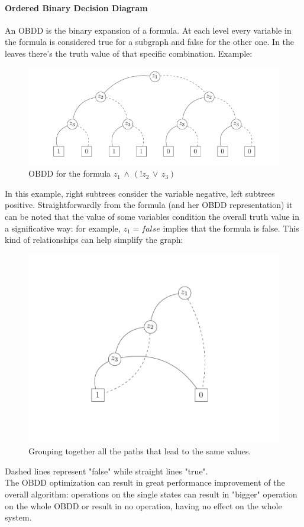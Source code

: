 \documentclass{article}
\begin{document}
				\paragraph{Ordered Binary Decision Diagram}
					An OBDD is the binary expansion of a formula. At each level every variable in the formula is considered true for a subgraph and false for the other one. In the leaves there's the truth value of that specific combination. Example:
					\begin{figure}[H]
						\centering
						\includegraphics[width = \textwidth]{./images/OBDD.png}
						\caption{OBDD for the formula $z_1 \,\wedge\, (!z_2 \,\vee\, z_3)$}
					\end{figure}
					In this example, right subtrees consider the variable negative, left subtrees positive. Straightforwardly from the formula (and her OBDD representation) it can be noted that the value of some variables condition the overall truth value in a significative way: for example, $z_1 = false$ implies that the formula is false. This kind of relationships can help simplify the graph:
					\begin{figure}[H]
						\centering
						\includegraphics[width = \textwidth]{./images/OBDD2.png}
						\caption{Grouping together all the paths that lead to the same values.}
					\end{figure}
					Dashed lines represent "false" while straight lines "true".\\
					The OBDD optimization can result in great performance improvement of the overall algorithm: operations on the single states can result in "bigger" operation on the whole OBDD or result in no operation, having no effect on the whole system. 
					
\end{document}
